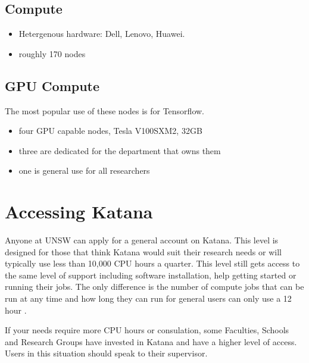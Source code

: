 \documentclass[letterpaper,10pt,english]{sphinxmanual}
\begin{document}
\subsection{Compute}
\label{\detokenize{using_katana/about_katana:compute}}\label{\detokenize{using_katana/about_katana:compute-resources}}\begin{itemize}
\item {} 
Hetergenous hardware: Dell, Lenovo, Huawei.

\item {} 
roughly 170 nodes

\end{itemize}


\subsection{GPU Compute}
\label{\detokenize{using_katana/about_katana:gpu-compute}}\label{\detokenize{using_katana/about_katana:gpu-resources}}
The most popular use of these nodes is for Tensorflow.
\begin{itemize}
\item {} 
four GPU capable nodes, Tesla V100\sphinxhyphen{}SXM2, 32GB

\item {} 
three are dedicated for the department that owns them

\item {} 
one is general use for all researchers

\end{itemize}


\section{Accessing Katana}
\label{\detokenize{using_katana/accessing_katana:accessing-katana}}\label{\detokenize{using_katana/accessing_katana::doc}}
Anyone at UNSW can apply for a general account on Katana. This level is designed for those that think Katana would suit their research needs or will typically use less than 10,000 CPU hours a quarter. This level still gets access to the same level of support including software installation, help getting started or running their jobs. The only difference is the number of compute jobs that can be run at any time and how long they can run for \sphinxhyphen{} general users can only use a 12 hour {\hyperref[\detokenize{glossary:term-Walltime}]{}}.

If your needs require more CPU hours or consulation, some Faculties, Schools and Research Groups have invested in Katana and have a higher level of access. Users in this situation should speak to their supervisor.
\end{document}
